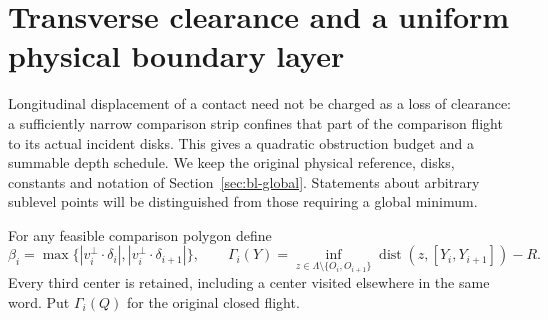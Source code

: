 \section{Transverse clearance and a uniform physical boundary layer}
\label{sec:tb-clearance}
Longitudinal displacement of a contact need not be charged as a loss
of clearance: a sufficiently narrow comparison strip confines that
part of the comparison flight to its actual incident disks.  This
gives a quadratic obstruction budget and a summable depth schedule.
We keep the original physical reference, disks, constants and notation
of Section~\ref{sec:bl-global}.  Statements about arbitrary sublevel
points will be distinguished from those requiring a global minimum.

For any feasible comparison polygon define
\begin{equation}\label{eq:tb-beta}
 \beta_i=\max\{|v_i^\perp\cdot\delta_i|,
                   |v_i^\perp\cdot\delta_{i+1}|\},\qquad
 \Gamma_i(Y)=\inf_{z\in\Lambda\setminus\{O_i,O_{i+1}\}}
                      \operatorname{dist}(z,[Y_i,Y_{i+1}])-R.
\end{equation}
Every third center is retained, including a center visited elsewhere
in the same word.  Put $\Gamma_i(Q)$ for the original closed flight.

